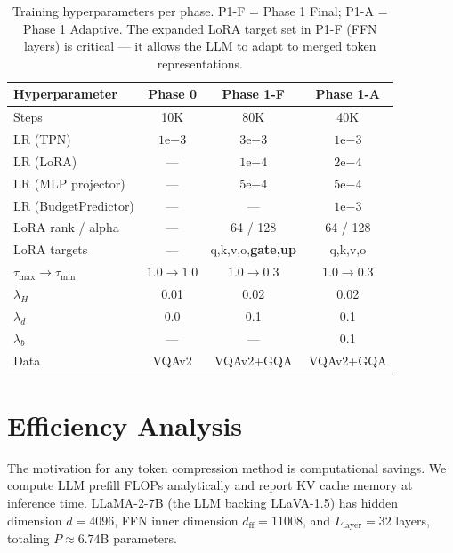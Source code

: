 \documentclass{article}
\begin{document}
\begin{table}[t]
\caption{Training hyperparameters per phase. P1-F = Phase 1 Final; P1-A = Phase 1
Adaptive. The expanded LoRA target set in P1-F (FFN layers) is critical — it
allows the LLM to adapt to merged token representations.}
\label{tab:hparam}
\vskip 0.1in
\centering
\begin{small}
\begin{tabular}{lccc}
\toprule
\textbf{Hyperparameter} & \textbf{Phase 0} & \textbf{Phase 1-F} & \textbf{Phase 1-A} \\
\midrule
Steps                  & 10K  & 80K  & 40K \\
LR (TPN)               & $1\mathrm{e}{-3}$ & $3\mathrm{e}{-3}$ & $1\mathrm{e}{-3}$ \\
LR (LoRA)              & —    & $1\mathrm{e}{-4}$ & $2\mathrm{e}{-4}$ \\
LR (MLP projector)     & —    & $5\mathrm{e}{-4}$ & $5\mathrm{e}{-4}$ \\
LR (BudgetPredictor)   & —    & —    & $1\mathrm{e}{-3}$ \\
LoRA rank / alpha      & —    & 64 / 128 & 64 / 128 \\
LoRA targets           & —    & q,k,v,o,\textbf{gate,up} & q,k,v,o \\
$\tau_{\max} \to \tau_{\min}$ & $1.0 \to 1.0$ & $1.0 \to 0.3$ & $1.0 \to 0.3$ \\
$\lambda_H$            & 0.01 & 0.02 & 0.02 \\
$\lambda_d$            & 0.0  & 0.1  & 0.1 \\
$\lambda_b$            & —    & —    & 0.1 \\
Data                   & VQAv2 & VQAv2+GQA & VQAv2+GQA \\
\bottomrule
\end{tabular}
\end{small}
\end{table}

\section{Efficiency Analysis}
\label{sec:efficiency}

The motivation for any token compression method is computational savings.
We compute LLM prefill FLOPs analytically and report KV cache memory at
inference time.
LLaMA-2-7B (the LLM backing LLaVA-1.5) has hidden dimension $d{=}4096$,
FFN inner dimension $d_{\mathrm{ff}}{=}11008$, and $L_{\mathrm{layer}}{=}32$ layers,
totaling $P{\approx}6.74$B parameters.
\end{document}
